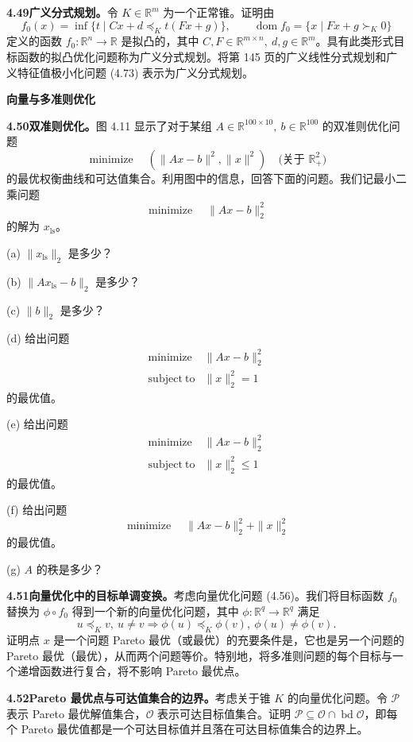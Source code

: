 \documentclass[UTF8,12pt,a4paper,fontset=fandol]{ctexart}
\begin{document}
\noindent\textbf{4.49\quad 广义分式规划。}\quad 令 $K\in\mathbb{R}^m$ 为一个正常锥。证明由
\[
f_0(x)=\inf\{t\mid Cx+d\preceq_K t(Fx+g)\},\qquad \operatorname{dom} f_0=\{x\mid Fx+g\succ_K0\}
\]
定义的函数 $f_0:\mathbb{R}^n\to\mathbb{R}$ 是拟凸的，其中 $C,F\in\mathbb{R}^{m\times n},\ d,g\in\mathbb{R}^m$。具有此类形式目标函数的拟凸优化问题称为广义分式规划。将第 145 页的广义线性分式规划和广义特征值极小化问题 (4.73) 表示为广义分式规划。

\noindent\textbf{向量与多准则优化}

\noindent\textbf{4.50\quad 双准则优化。}\quad 图 4.11 显示了对于某组 $A\in\mathbb{R}^{100\times10},\ b\in\mathbb{R}^{100}$ 的双准则优化问题
\[
\mathop{\mathrm{minimize}}\quad (\|Ax-b\|^2,\|x\|^2)\quad \text{(关于 }\mathbb{R}_+^2\text{)}
\]
的最优权衡曲线和可达值集合。利用图中的信息，回答下面的问题。我们记最小二乘问题
\[
\mathop{\mathrm{minimize}}\quad \|Ax-b\|_2^2
\]
的解为 $x_{\mathrm{ls}}$。

(a) $\|x_{\mathrm{ls}}\|_2$ 是多少？

(b) $\|Ax_{\mathrm{ls}}-b\|_2$ 是多少？

(c) $\|b\|_2$ 是多少？

(d) 给出问题
\[
\begin{array}{ll}
\mathop{\mathrm{minimize}} & \|Ax-b\|_2^2\\
\mathrm{subject\ to} & \|x\|_2^2=1
\end{array}
\]
的最优值。

(e) 给出问题
\[
\begin{array}{ll}
\mathop{\mathrm{minimize}} & \|Ax-b\|_2^2\\
\mathrm{subject\ to} & \|x\|_2^2\leq1
\end{array}
\]
的最优值。

(f) 给出问题
\[
\mathop{\mathrm{minimize}}\quad \|Ax-b\|_2^2+\|x\|_2^2
\]
的最优值。

(g) $A$ 的秩是多少？

\noindent\textbf{4.51\quad 向量优化中的目标单调变换。}\quad 考虑向量优化问题 (4.56)。我们将目标函数 $f_0$ 替换为 $\phi\circ f_0$ 得到一个新的向量优化问题，其中 $\phi:\mathbb{R}^q\to\mathbb{R}^q$ 满足
\[
u\preceq_K v,\ u\neq v\Longrightarrow \phi(u)\preceq_K\phi(v),\ \phi(u)\neq\phi(v).
\]
证明点 $x$ 是一个问题 Pareto 最优（或最优）的充要条件是，它也是另一个问题的 Pareto 最优（最优），从而两个问题等价。特别地，将多准则问题的每个目标与一个递增函数进行复合，将不影响 Pareto 最优点。

\noindent\textbf{4.52\quad Pareto 最优点与可达值集合的边界。}\quad 考虑关于锥 $K$ 的向量优化问题。令 $\mathcal{P}$ 表示 Pareto 最优解值集合，$\mathcal{O}$ 表示可达目标值集合。证明 $\mathcal{P}\subseteq\mathcal{O}\cap\operatorname{bd}\mathcal{O}$，即每个 Pareto 最优值都是一个可达目标值并且落在可达目标值集合的边界上。
\end{document}
